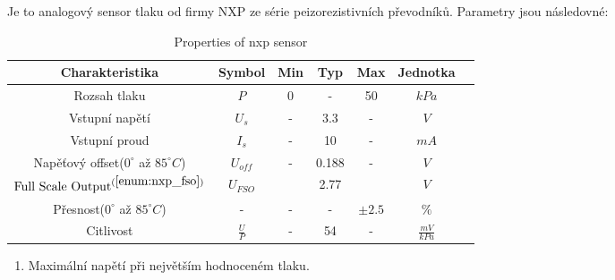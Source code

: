 Je to analogový sensor tlaku od firmy NXP ze série peizorezistivních převodníků. Parametry jsou následovné:
\begin{table}[H]
    \label{tab:nxp_properties}
    \caption{Properties of nxp sensor}
    \begin{ctucolortab}
        \begin{tabular}{ccccccc}
            \toprule
            Charakteristika                                         & Symbol        & Min & Typ   & Max        & Jednotka         & \\ \midrule
            Rozsah tlaku                                            & $P$           & 0   & -     & 50         & $kPa$            & \\
            Vstupní napětí                                          & $U_{s}$       & -   & 3.3   & -          & $V$              & \\
            Vstupní proud                                           & $I_{s}$       & -   & 10    & -          & $mA$             & \\
            Napěťový offset($0^{\circ}$ až $ 85^{\circ}  C $)       & $U_{off}$     & -   & 0.188 & -          & $V$              & \\
            $\textnormal{Full Scale Output}^{(\ref{enum:nxp_fso})}$ & $U_{FSO}$     &     & 2.77  &            & $V$              & \\
            Přesnost($0^{\circ}$ až $ 85^{\circ} C$)                & -             & -   & -     & $\pm 2.5 $ & $\%$             & \\
            Citlivost                                               & $\frac{U}{P}$ & -   & 54    & -          & $\frac{mV}{kPa}$ & \\
            \bottomrule
        \end{tabular}
    \end{ctucolortab}

    \begin{enumerate}
        \item \label{enum:nxp_fso} Maximální napětí při největším hodnoceném tlaku.
    \end{enumerate}
\end{table}

